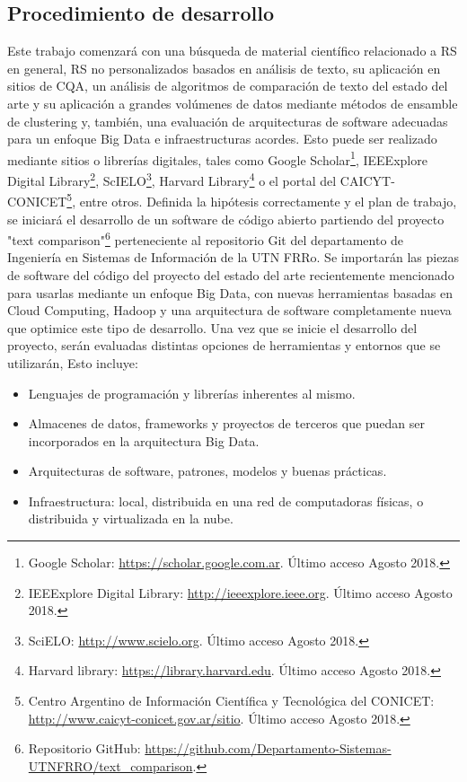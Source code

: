 \subsection{Procedimiento de desarrollo}
\noindent Este trabajo comenzará con una búsqueda de material científico relacionado a RS en general, RS no personalizados basados en análisis de texto, su aplicación en sitios de CQA, un análisis de algoritmos de comparación de texto del estado del arte y su aplicación a grandes volúmenes de datos mediante métodos de ensamble de clustering y, también, una evaluación de arquitecturas de software adecuadas para un enfoque Big Data e infraestructuras acordes. Esto puede ser realizado mediante sitios o librerías digitales, tales como Google Scholar\footnote{Google Scholar: \url{https://scholar.google.com.ar}. Último acceso Agosto 2018.}, IEEExplore Digital Library\footnote{IEEExplore Digital Library: \url{http://ieeexplore.ieee.org}. Último acceso Agosto 2018.}, ScIELO\footnote{SciELO: \url{http://www.scielo.org}. Último acceso Agosto 2018.}, Harvard Library\footnote{Harvard library: \url{https://library.harvard.edu}. Último acceso Agosto 2018.} o el portal del CAICYT-CONICET\footnote{Centro Argentino de Información Científica y Tecnológica del CONICET: \url{http://www.caicyt-conicet.gov.ar/sitio}. Último acceso Agosto 2018.}, entre otros.
Definida la hipótesis correctamente y el plan de trabajo, se iniciará el desarrollo de un software de código abierto partiendo del proyecto "text comparison"\footnote{Repositorio GitHub: \url{https://github.com/Departamento-Sistemas-UTNFRRO/text_comparison}.} perteneciente al repositorio Git del departamento de Ingeniería en Sistemas de Información de la UTN FRRo. Se importarán las piezas de software del código del proyecto del estado del arte recientemente mencionado para usarlas mediante un enfoque Big Data, con nuevas herramientas basadas en Cloud Computing, Hadoop y una arquitectura de software completamente nueva que optimice este tipo de desarrollo. Una vez que se inicie el desarrollo del proyecto, serán evaluadas distintas opciones de herramientas y entornos que se utilizarán, Esto incluye:
\begin{itemize}
	\item Lenguajes de programación y librerías inherentes al mismo.
	\item Almacenes de datos, frameworks y proyectos de terceros que puedan ser incorporados en la arquitectura Big Data.
	\item Arquitecturas de software, patrones, modelos y buenas prácticas.
	\item Infraestructura: local, distribuida en una red de computadoras físicas, o distribuida y virtualizada en la nube.
\end{itemize}

